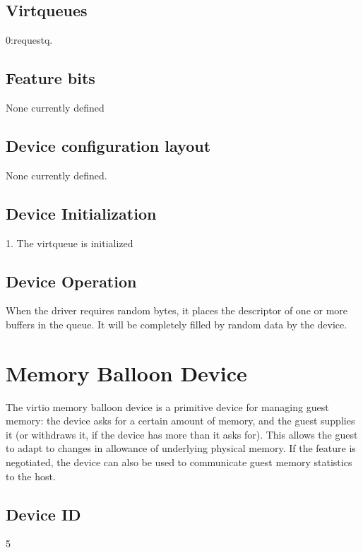 \subsection{Virtqueues}\label{sec:Device Types / Entropy Device / Virtqueues}
  0:requestq.

\subsection{Feature bits}\label{sec:Device Types / Entropy Device / Feature bits}
  None currently defined

\subsection{Device configuration layout}\label{sec:Device Types / Entropy Device / Device configuration layout}
  None currently defined.

\subsection{Device Initialization}\label{sec:Device Types / Entropy Device / Device Initialization}

1. The virtqueue is initialized

\subsection{Device Operation}\label{sec:Device Types / Entropy Device / Device Operation}

When the driver requires random bytes, it places the descriptor
of one or more buffers in the queue. It will be completely filled
by random data by the device.

\section{Memory Balloon Device}\label{sec:Device Types / Memory Balloon Device}

The virtio memory balloon device is a primitive device for
managing guest memory: the device asks for a certain amount of
memory, and the guest supplies it (or withdraws it, if the device
has more than it asks for). This allows the guest to adapt to
changes in allowance of underlying physical memory. If the
feature is negotiated, the device can also be used to communicate
guest memory statistics to the host.

\subsection{Device ID}\label{sec:Device Types / Memory Balloon Device / Device ID}
  5

